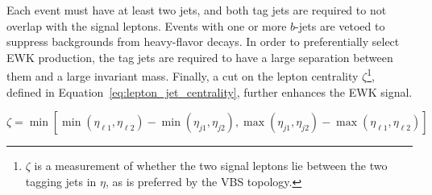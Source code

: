 Each event must have at least two jets, and both tag jets are required to not overlap with the signal leptons.
Events with one or more $b$-jets are vetoed to suppress backgrounds from heavy-flavor decays.
In order to preferentially select EWK production, the tag jets are required to have a large separation between them and a large invariant mass.
Finally, a cut on the lepton centrality $\zeta$\footnote{$\zeta$ is a measurement of whether the two signal leptons lie between the two tagging jets in $\eta$, as is preferred by the VBS topology.}, defined in Equation~\ref{eq:lepton_jet_centrality}, further enhances the EWK \ssww signal.

\begin{equation}
\zeta = \min [\min (\eta_{\ell1}, \eta_{\ell2} )-\min(\eta_{j1},\eta_{j2}), \max(\eta_{j1},\eta_{j2})-\max(\eta_{\ell1},\eta_{\ell2}) ]
\label{eq:lepton_jet_centrality}
\end{equation}
